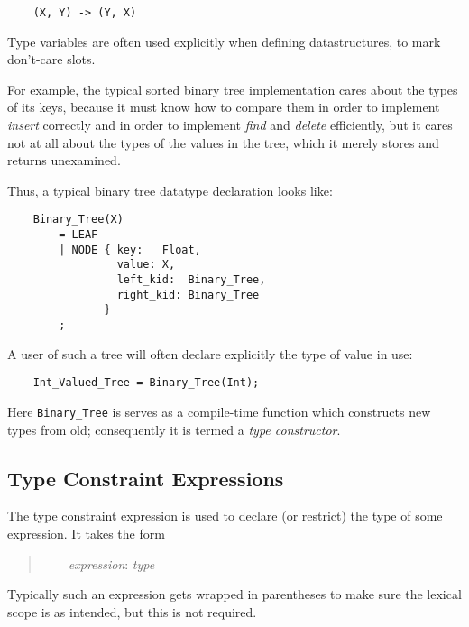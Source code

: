 \begin{verbatim}
    (X, Y) -> (Y, X)
\end{verbatim}

Type variables are often used explicitly when defining 
datastructures, to mark don't-care slots.

For example, the typical sorted binary tree implementation cares about 
the types of its keys, because it must know how to compare them in 
order to implement {\it insert} correctly and in order to implement 
{\it find} and {\it delete} efficiently, but it cares not at all about 
the types of the values in the tree, which it merely stores and 
returns unexamined.

Thus, a typical binary tree datatype declaration looks like:

\begin{verbatim}
    Binary_Tree(X)
        = LEAF
        | NODE { key:   Float,
                 value: X,
                 left_kid:  Binary_Tree,
                 right_kid: Binary_Tree
               }
        ;
\end{verbatim}

A user of such a tree will often declare 
explicitly the type of value in use:

\begin{verbatim}
    Int_Valued_Tree = Binary_Tree(Int);
\end{verbatim}

Here {\tt Binary\_Tree} is serves as a compile-time function which  
constructs new types from old;  consequently it is termed a 
{\it type constructor}.

\cutend*


\subsection{Type Constraint Expressions}
\label{section:ref:types:type-constraint-expressions}

The type constraint expression is used to declare (or restrict) the type of some expression. 
It takes the form

\begin{quotation}
~~~~{\it expression}: {\it type}
\end{quotation}

Typically such an expression gets wrapped in parentheses to make sure 
the lexical scope is as intended, but this is not required.

